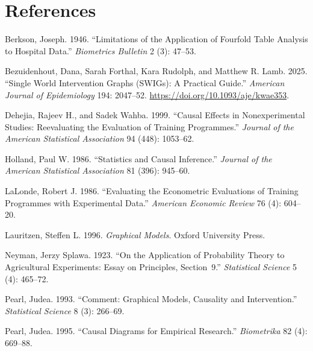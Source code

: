 \documentclass[
  a4paper,
]{book}
\newlength{\cslhangindent}
\newenvironment{CSLReferences}[2] %
 {\begin{list}{}{%
  \setlength{\itemindent}{0pt}
  \setlength{\leftmargin}{0pt}
  \setlength{\parsep}{0pt}
  \ifodd #1
   \setlength{\leftmargin}{\cslhangindent}
   \setlength{\itemindent}{-1\cslhangindent}
  \fi
  \setlength{\itemsep}{#2\baselineskip}}}
 {\end{list}}
\begin{document}

\chapter*{References}\label{references}


\protect{}\label{refs}
\begin{CSLReferences}{1}{1}
Berkson, Joseph. 1946. {``Limitations of the Application of Fourfold
Table Analysis to Hospital Data.''} \emph{Biometrics Bulletin} 2 (3):
47--53.

Bezuidenhout, Dana, Sarah Forthal, Kara Rudolph, and Matthew R. Lamb.
2025. {``Single World Intervention Graphs ({SWIGs}): A Practical
Guide.''} \emph{American Journal of Epidemiology} 194: 2047--52.
\url{https://doi.org/10.1093/aje/kwae353}.

Dehejia, Rajeev H., and Sadek Wahba. 1999. {``Causal Effects in
Nonexperimental Studies: Reevaluating the Evaluation of Training
Programmes.''} \emph{Journal of the American Statistical Association} 94
(448): 1053--62.

Holland, Paul W. 1986. {``Statistics and Causal Inference.''}
\emph{Journal of the American Statistical Association} 81 (396):
945--60.

LaLonde, Robert J. 1986. {``Evaluating the Econometric Evaluations of
Training Programmes with Experimental Data.''} \emph{American Economic
Review} 76 (4): 604--20.

Lauritzen, Steffen L. 1996. \emph{Graphical Models}. Oxford University
Press.

Neyman, Jerzy Splawa. 1923. {``On the Application of Probability Theory
to Agricultural Experiments: Essay on Principles, Section~9.''}
\emph{Statistical Science} 5 (4): 465--72.

Pearl, Judea. 1993. {``Comment: Graphical Models, Causality and
Intervention.''} \emph{Statistical Science} 8 (3): 266--69.

Pearl, Judea. 1995. {``Causal Diagrams for Empirical Research.''}
\emph{Biometrika} 82 (4): 669--88.


\end{CSLReferences}
\end{document}
